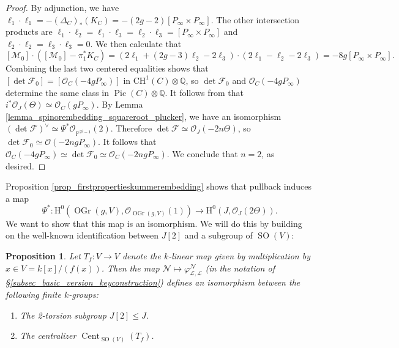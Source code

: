 \documentclass{article} %
\newtheorem{proposition}{Proposition}[section]
\numberwithin{equation}{section}
\DeclareMathOperator{\SO}{SO}
\DeclareMathOperator{\Pic}{Pic}
\newcommand{\sh}[1]{\mathscr{#1}}
\renewcommand{\P}{\mathbb{P}}
\renewcommand{\O}{\mathcal{O}}
\newcommand{\HH}{\mathrm{H}}
\newcommand{\cO}{\mathcal{O}}
\newcommand{\Q}{\mathbb{Q}}
\DeclareMathOperator{\OGr}{OGr}
\begin{document}
\begin{proof}
    By adjunction, we have $\ell_1\cdot \ell_1 = -(\Delta_C)_*(K_C) = -(2g-2)[P_{\infty}\times P_{\infty}]$.
    The other intersection products are $\ell_1\cdot \ell_2 = \ell_1\cdot \ell_3  =\ell_2\cdot \ell_3 = [P_{\infty}\times P_{\infty}]$ and $\ell_2 \cdot \ell_2 = \ell_3\cdot \ell_3 = 0$.
    We then calculate that 
    \[
    [\sh{M}_0]\cdot ([\sh{M}_0] - \pi_1^*K_C)=
    (2\ell_1 + (2g-3)\ell_2 - 2\ell_3)\cdot
    (2\ell_1 -\ell_2 -2\ell_3)=
    -8g[P_{\infty}\times P_{\infty}].
    \]
    Combining the last two centered equalities shows that $[\det \sh{F}_0] = [\O_C(-4gP_{\infty})]$ in $\mathrm{CH}^1(C)\otimes \Q$, so $\det  \sh{F}_0$ and $\O_C(-4gP_{\infty})$ determine the same class in $\Pic(C) \otimes \Q$.
    It follows from \cite[Section 11.12, Exercise 10]{BirkenhakeLangeAV} that $i^*\O_J(\Theta)\simeq \O_C(gP_{\infty})$.
    By Lemma \ref{lemma_spinorembedding_squareroot_plucker}, we have an isomorphism $(\det\sh{F})^{\vee}\simeq \Psi^*\O_{\P^{2^g-1}}(2)$. 
    Therefore $\det \sh{F} \simeq \O_J(-2n\Theta)$, so $\det\sh{F}_0 \simeq \O(-2ng P_{\infty})$. 
    It follows that $\O_C(-4gP_{\infty})\simeq \det \sh{F}_0 \simeq \O_C(-2ng P_{\infty})$.
    We conclude that $n=2$, as desired.
\end{proof} 
Proposition \ref{prop_firstpropertieskummerembedding} shows that pullback induces a map 
\begin{equation}\label{eqn_Psi_pullback} \Psi^\ast : \HH^0(\OGr(g, V), \cO_{\OGr(g, V)}(1)) \to \HH^0(J, \cO_J(2 \Theta)).
\end{equation}
We want to show that this map is an isomorphism. We will do this by building on the well-known identification between $J[2]$ and a subgroup of $\SO(V)$:
\begin{proposition}\label{prop_identification_of_stabiliser_and_2_torsion}
    Let $T_f : V \to V$ denote the $k$-linear map given by multiplication by $x \in V = k[x] / (f(x))$. Then the map $\sh{N} \mapsto \varphi^{\sh{N}}_{\sh{L}, \sh{L}}$ (in the notation of \S\ref{subsec_basic_version_keyconstruction}) defines an isomorphism between the following finite $k$-groups:
    \begin{enumerate}
      \item The 2-torsion subgroup $J[2] \leq J$.
        \item The centralizer $\operatorname{Cent}_{\SO(V)}(T_f)$.
    \end{enumerate}
\end{proposition}
\end{document}
